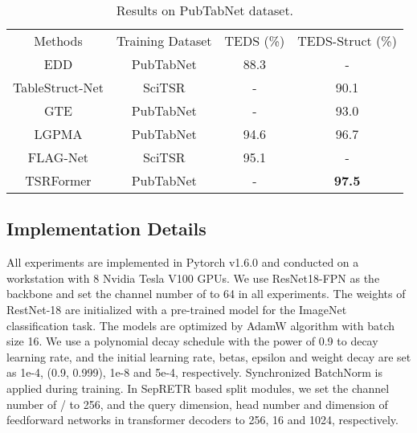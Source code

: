 \documentclass[sigconf]{acmart}
\begin{document}
\setlength{\tabcolsep}{4pt}
\begin{table}
\small
\begin{center}
\caption{Results on PubTabNet dataset.}
\label{table:PubTabNet}
\begin{tabular}{cccc}
\hline\noalign{\smallskip}
Methods & Training Dataset & TEDS (\%) & TEDS-Struct (\%)\\
\noalign{\smallskip}
\hline
\noalign{\smallskip}
EDD \cite{zhong2020image}  & PubTabNet & 88.3 & -\\
TableStruct-Net \cite{TabStruct2020}  & SciTSR & - & 90.1\\
GTE \cite{GTE2021}  & PubTabNet & - & 93.0\\
LGPMA \cite{Qiao2021LGPMACT}  & PubTabNet & 94.6 & 96.7\\
FLAG-Net \cite{FLAG2021}  & SciTSR & 95.1 & -\\
\hline
TSRFormer  & PubTabNet & - & \textbf{97.5}\\
\hline
\end{tabular}
\end{center}
\end{table}
\setlength{\tabcolsep}{1.4pt}

\subsection{Implementation Details}
All experiments are implemented in Pytorch v1.6.0 and conducted on a workstation with 8 Nvidia Tesla V100 GPUs. We use ResNet18-FPN as the backbone and set the channel number of  to 64 in all experiments. The weights of RestNet-18 are initialized with a pre-trained model for the ImageNet classification task. The models are optimized by AdamW \cite{loshchilov2017decoupled} algorithm with batch size 16. We use a polynomial decay schedule with the power of 0.9 to decay learning rate, and the initial learning rate, betas, epsilon and weight decay are set as
1e-4, (0.9, 0.999), 1e-8 and 5e-4, respectively. Synchronized BatchNorm is applied during training. In SepRETR based split modules, we set the channel number of / to 256, and the query dimension, head number and dimension of feedforward networks in transformer decoders to 256, 16 and 1024, respectively.
\end{document}
